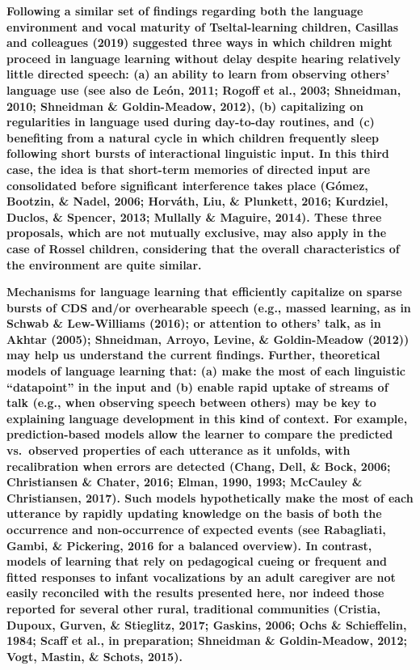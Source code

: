 \documentclass[,man,floatsintext]{apa6}
\begin{document}
\textbf{Following a similar set of findings regarding both the language
environment and vocal maturity of Tseltal-learning children, Casillas
and colleagues (2019) suggested three ways in which children might
proceed in language learning without delay despite hearing relatively
little directed speech: (a) an ability to learn from observing others'
language use (see also de León, 2011; Rogoff et al., 2003; Shneidman,
2010; Shneidman \& Goldin-Meadow, 2012), (b) capitalizing on
regularities in language used during day-to-day routines, and (c)
benefiting from a natural cycle in which children frequently sleep
following short bursts of interactional linguistic input. In this third
case, the idea is that short-term memories of directed input are
consolidated before significant interference takes place (Gómez,
Bootzin, \& Nadel, 2006; Horváth, Liu, \& Plunkett, 2016; Kurdziel,
Duclos, \& Spencer, 2013; Mullally \& Maguire, 2014). These three
proposals, which are not mutually exclusive, may also apply in the case
of Rossel children, considering that the overall characteristics of the
environment are quite similar.}

\textbf{Mechanisms for language learning that efficiently capitalize on
sparse bursts of CDS and/or overhearable speech (e.g., massed learning,
as in Schwab \& Lew-Williams (2016); or attention to others' talk, as in
Akhtar (2005); Shneidman, Arroyo, Levine, \& Goldin-Meadow (2012)) may
help us understand the current findings. Further, theoretical models of
language learning that: (a) make the most of each linguistic
\enquote{datapoint} in the input and (b) enable rapid uptake of streams
of talk (e.g., when observing speech between others) may be key to
explaining language development in this kind of context. For example,
prediction-based models allow the learner to compare the predicted
vs.~observed properties of each utterance as it unfolds, with
recalibration when errors are detected (Chang, Dell, \& Bock, 2006;
Christiansen \& Chater, 2016; Elman, 1990, 1993; McCauley \&
Christiansen, 2017). Such models hypothetically make the most of each
utterance by rapidly updating knowledge on the basis of both the
occurrence and non-occurrence of expected events (see Rabagliati, Gambi,
\& Pickering, 2016 for a balanced overview). In contrast, models of
learning that rely on pedagogical cueing or frequent and fitted
responses to infant vocalizations by an adult caregiver are not easily
reconciled with the results presented here, nor indeed those reported
for several other rural, traditional communities (Cristia, Dupoux,
Gurven, \& Stieglitz, 2017; Gaskins, 2006; Ochs \& Schieffelin, 1984;
Scaff et al., in preparation; Shneidman \& Goldin-Meadow, 2012; Vogt,
Mastin, \& Schots, 2015).}
\end{document}
